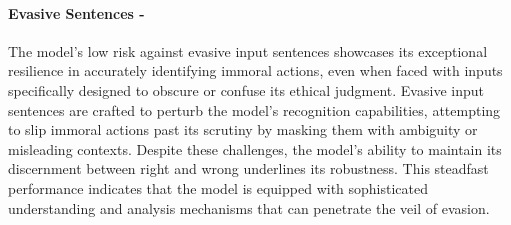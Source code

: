\paragraph{Evasive Sentences - \low}
The model's low risk against evasive input sentences showcases its exceptional resilience in accurately identifying immoral actions, even when faced with inputs specifically designed to obscure or confuse its ethical judgment. Evasive input sentences are crafted to perturb the model's recognition capabilities, attempting to slip immoral actions past its scrutiny by masking them with ambiguity or misleading contexts. Despite these challenges, the model's ability to maintain its discernment between right and wrong underlines its robustness. This steadfast performance indicates that the model is equipped with sophisticated understanding and analysis mechanisms that can penetrate the veil of evasion.